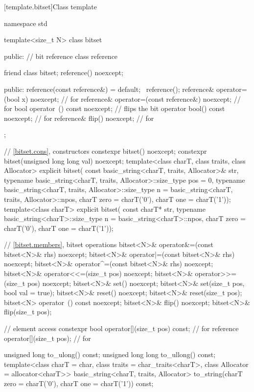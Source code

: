[template.bitset]{Class template }%
%
\begin{codeblock}
namespace std {
  template<size_t N> class bitset {
  public:
    // bit reference
    class reference {
      friend class bitset;
      reference() noexcept;

    public:
      reference(const reference&) = default;
      ~reference();
      reference& operator=(bool x) noexcept;            // for 
      reference& operator=(const reference&) noexcept;  // for 
      bool operator~() const noexcept;                  // flips the bit
      operator bool() const noexcept;                   // for 
      reference& flip() noexcept;                       // for 
    };

    // \ref{bitset.cons}, constructors
    constexpr bitset() noexcept;
    constexpr bitset(unsigned long long val) noexcept;
    template<class charT, class traits, class Allocator>
      explicit bitset(
        const basic_string<charT, traits, Allocator>& str,
        typename basic_string<charT, traits, Allocator>::size_type pos = 0,
        typename basic_string<charT, traits, Allocator>::size_type n
          = basic_string<charT, traits, Allocator>::npos,
        charT zero = charT('0'),
        charT one = charT('1'));
    template<class charT>
      explicit bitset(
        const charT* str,
        typename basic_string<charT>::size_type n = basic_string<charT>::npos,
        charT zero = charT('0'),
        charT one = charT('1'));

    // \ref{bitset.members}, bitset operations
    bitset<N>& operator&=(const bitset<N>& rhs) noexcept;
    bitset<N>& operator|=(const bitset<N>& rhs) noexcept;
    bitset<N>& operator^=(const bitset<N>& rhs) noexcept;
    bitset<N>& operator<<=(size_t pos) noexcept;
    bitset<N>& operator>>=(size_t pos) noexcept;
    bitset<N>& set() noexcept;
    bitset<N>& set(size_t pos, bool val = true);
    bitset<N>& reset() noexcept;
    bitset<N>& reset(size_t pos);
    bitset<N>  operator~() const noexcept;
    bitset<N>& flip() noexcept;
    bitset<N>& flip(size_t pos);

    // element access
    constexpr bool operator[](size_t pos) const;        // for 
    reference operator[](size_t pos);                   // for 

    unsigned long to_ulong() const;
    unsigned long long to_ullong() const;
    template<class charT = char,
             class traits = char_traits<charT>,
             class Allocator = allocator<charT>>
      basic_string<charT, traits, Allocator>
        to_string(charT zero = charT('0'), charT one = charT('1')) const;

}}
\end{codeblock}
